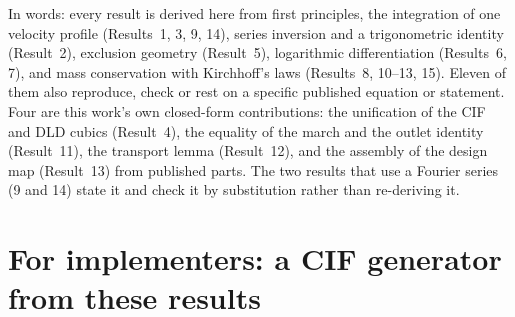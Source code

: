 \noindent In words: every result is derived here from first principles, the integration of one
velocity profile (Results~1, 3, 9, 14), series inversion and a trigonometric identity
(Result~2), exclusion geometry (Result~5), logarithmic differentiation (Results~6, 7), and mass
conservation with Kirchhoff's laws (Results~8, 10--13, 15). Eleven of them also reproduce,
check or rest on a specific published equation or statement. Four are this work's own
closed-form contributions: the unification of the CIF and DLD cubics (Result~4), the equality of
the march and the outlet identity (Result~11), the transport lemma (Result~12), and the
assembly of the design map (Result~13) from published parts. The two results that use a Fourier
series (9 and 14) state it and check it by substitution rather than re-deriving it.

\section{For implementers: a CIF generator from these results}
\label{sec:implement}

